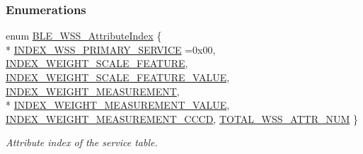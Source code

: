 \subsubsection*{Enumerations}
\begin{DoxyCompactItemize}
\item 
enum \hyperlink{group___b_l_e___w_s_s_ga4aa32944ddd942ab81cfaf0b16a08d4f}{B\+L\+E\+\_\+\+W\+S\+S\+\_\+\+Attribute\+Index} \{ \\*
\hyperlink{group___b_l_e___w_s_s_gga4aa32944ddd942ab81cfaf0b16a08d4fa583ae2a1d7b939a33efa1e0355182743}{I\+N\+D\+E\+X\+\_\+\+W\+S\+S\+\_\+\+P\+R\+I\+M\+A\+R\+Y\+\_\+\+S\+E\+R\+V\+I\+CE} =0x00, 
\hyperlink{group___b_l_e___w_s_s_gga4aa32944ddd942ab81cfaf0b16a08d4fa9adb2e6cf8997687d1202ef80196597f}{I\+N\+D\+E\+X\+\_\+\+W\+E\+I\+G\+H\+T\+\_\+\+S\+C\+A\+L\+E\+\_\+\+F\+E\+A\+T\+U\+RE}, 
\hyperlink{group___b_l_e___w_s_s_gga4aa32944ddd942ab81cfaf0b16a08d4fa79701c7e4013fd27124e6231aa810066}{I\+N\+D\+E\+X\+\_\+\+W\+E\+I\+G\+H\+T\+\_\+\+S\+C\+A\+L\+E\+\_\+\+F\+E\+A\+T\+U\+R\+E\+\_\+\+V\+A\+L\+UE}, 
\hyperlink{group___b_l_e___w_s_s_gga4aa32944ddd942ab81cfaf0b16a08d4fafcf490c424247c08675508f29589916e}{I\+N\+D\+E\+X\+\_\+\+W\+E\+I\+G\+H\+T\+\_\+\+M\+E\+A\+S\+U\+R\+E\+M\+E\+NT}, 
\\*
\hyperlink{group___b_l_e___w_s_s_gga4aa32944ddd942ab81cfaf0b16a08d4fac2d665aa9b6da6c1273bf6589c9f5fcc}{I\+N\+D\+E\+X\+\_\+\+W\+E\+I\+G\+H\+T\+\_\+\+M\+E\+A\+S\+U\+R\+E\+M\+E\+N\+T\+\_\+\+V\+A\+L\+UE}, 
\hyperlink{group___b_l_e___w_s_s_gga4aa32944ddd942ab81cfaf0b16a08d4faa8e164a64c68f971e22ad41a904a4849}{I\+N\+D\+E\+X\+\_\+\+W\+E\+I\+G\+H\+T\+\_\+\+M\+E\+A\+S\+U\+R\+E\+M\+E\+N\+T\+\_\+\+C\+C\+CD}, 
\hyperlink{group___b_l_e___w_s_s_gga4aa32944ddd942ab81cfaf0b16a08d4faf16c4e52a144cec4f68023587c14c786}{T\+O\+T\+A\+L\+\_\+\+W\+S\+S\+\_\+\+A\+T\+T\+R\+\_\+\+N\+UM}
 \}\begin{DoxyCompactList}\small\item\em Attribute index of the service table. \end{DoxyCompactList}
\end{DoxyCompactItemize}
